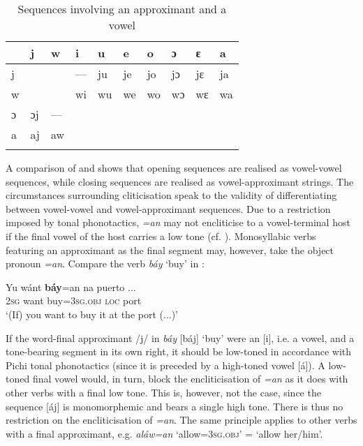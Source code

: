 \begin{table}[t]
\caption{Sequences involving an approximant and a vowel}
\label{tab:key:2.10}

\begin{tabularx}{\textwidth}{XXXXXXXXXX}
\lsptoprule
 & j & w & i & u & e & o & ɔ & ɛ & a\\
\midrule 
j &  &  & {}--- & ju & je & jo & jɔ & jɛ & ja\\
w &  &  & wi & wu & we & wo & wɔ & wɛ & wa\\
ɔ & ɔj & {}--- &  &  &  &  &  &  & \\
a & aj & aw &  &  &  &  &  &  & \\
\lspbottomrule
\end{tabularx}
\end{table}

\newpage 
A comparison of  and  shows that opening sequences are realised as vowel-vowel sequences, while closing sequences are realised as vowel-approximant strings. The circumstances surrounding cliticisation speak to the validity of differentiating between vowel-vowel and vowel-approximant sequences. Due to a restriction imposed by tonal phonotactics, \textit{=an} may not encliticise to a vowel-terminal host if the final vowel of the host carries a low tone (cf. ). Monosyllabic verbs featuring an approximant as the final segment may, however, take the object pronoun \textit{=an}. Compare the verb \textit{báy} ‘buy’ in : 

\ea%
    \label{ex:key:41}
    \gll   Yu  wánt  \textbf{báy}=an    na  puerto  \op...\cp\\
\textsc{2sg}  want  buy=\textsc{3sg.obj}  \textsc{loc}  port\\
\glt  ‘(If) you want to buy it at the port (...)’
\z

If the word-final approximant /j/ in \textit{báy} [báj] ‘buy’ were an [i], i.e. a vowel, and a tone-bearing segment in its own right, it should be low-toned in accordance with Pichi tonal phonotactics (since it is preceded by a high-toned vowel [á]). A low-toned final vowel would, in turn, block the encliticisation of \textit{=an} as it does with other verbs with a final low tone. This is, however, not the case, since the sequence [áj] is monomorphemic and bears a single high tone. There is thus no restriction on the encliticisation of \textit{=an}. The same principle applies to other verbs with a final approximant, e.g. \textit{aláw=an} ‘allow=\textsc{3sg.obj}’ = ‘allow her/him’.


